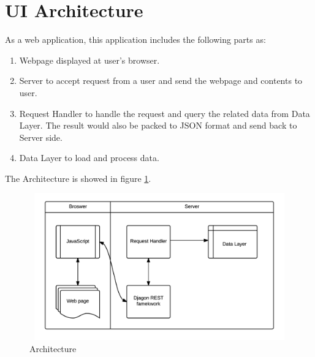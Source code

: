 \documentclass[11pt,letter]{article}
\begin{document}
\section {UI Architecture}
As a web application, this application includes the following parts as: \\
\begin{enumerate}
\item Webpage displayed at user's browser.
\item Server to accept request from a user and send the webpage and contents to user.
\item Request Handler to handle the request and query the related data from Data Layer. The result would also be packed to JSON format and send back to Server side.
\item Data Layer to load and process data.
\end{enumerate}

The Architecture is showed in figure \ref{architecture}.
\begin{figure}[h!]
\centering
\includegraphics[height=2.5in, width=5in]{./fig/arch.png}
\caption{Architecture}
\label{architecture}
\end{figure}
\end{document}
